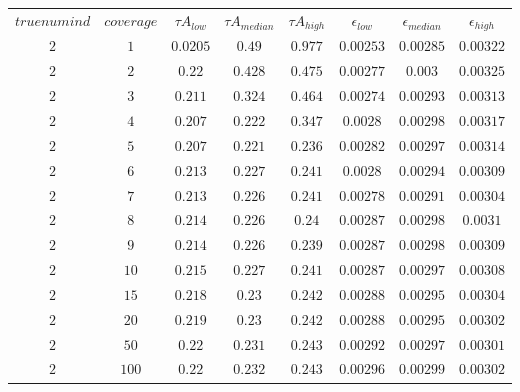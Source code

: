 \begin{table}[H]
\begin{tabular}{cccccccc}
$truenumind$ & $coverage$ & ${\tau}A_{low}$ & ${\tau}A_{median}$ & ${\tau}A_{high}$ & $\epsilon_{low}$ & $\epsilon_{median}$ & $\epsilon_{high}$\\
$2$ & $1$ & $0.0205$ & $0.49$ & $0.977$ & $0.00253$ & $0.00285$ & $0.00322$\\
$2$ & $2$ & $0.22$ & $0.428$ & $0.475$ & $0.00277$ & $0.003$ & $0.00325$\\
$2$ & $3$ & $0.211$ & $0.324$ & $0.464$ & $0.00274$ & $0.00293$ & $0.00313$\\
$2$ & $4$ & $0.207$ & $0.222$ & $0.347$ & $0.0028$ & $0.00298$ & $0.00317$\\
$2$ & $5$ & $0.207$ & $0.221$ & $0.236$ & $0.00282$ & $0.00297$ & $0.00314$\\
$2$ & $6$ & $0.213$ & $0.227$ & $0.241$ & $0.0028$ & $0.00294$ & $0.00309$\\
$2$ & $7$ & $0.213$ & $0.226$ & $0.241$ & $0.00278$ & $0.00291$ & $0.00304$\\
$2$ & $8$ & $0.214$ & $0.226$ & $0.24$ & $0.00287$ & $0.00298$ & $0.0031$\\
$2$ & $9$ & $0.214$ & $0.226$ & $0.239$ & $0.00287$ & $0.00298$ & $0.00309$\\
$2$ & $10$ & $0.215$ & $0.227$ & $0.241$ & $0.00287$ & $0.00297$ & $0.00308$\\
$2$ & $15$ & $0.218$ & $0.23$ & $0.242$ & $0.00288$ & $0.00295$ & $0.00304$\\
$2$ & $20$ & $0.219$ & $0.23$ & $0.242$ & $0.00288$ & $0.00295$ & $0.00302$\\
$2$ & $50$ & $0.22$ & $0.231$ & $0.243$ & $0.00292$ & $0.00297$ & $0.00301$\\
$2$ & $100$ & $0.22$ & $0.232$ & $0.243$ & $0.00296$ & $0.00299$ & $0.00302$\\
\end{tabular}
\end{table}
 